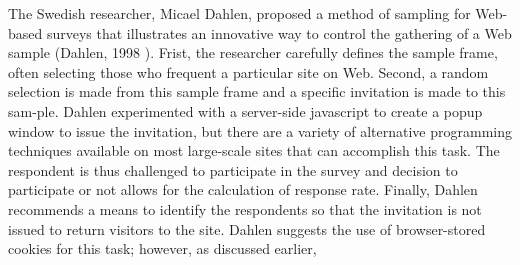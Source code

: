 \documentclass{article}
\begin{document}
The Swedish researcher, Micael Dahlen, proposed a method of sampling for Web-based surveys that illustrates an innovative way to control the gathering of a Web sample (Dahlen, 1998 ). Frist, the researcher carefully defines the sample frame, often selecting those who frequent a particular site on Web. Second, a random selection is made from this sample frame and a specific invitation is made to this sam-ple. Dahlen experimented with a server-side javascript to create a popup window to issue the invitation, but there are a variety of alternative programming techniques available on most large-scale sites that can accomplish this task. The respondent is thus challenged to participate in the survey and decision to participate or not allows for the calculation of response rate. Finally, Dahlen recommends a means to identify the respondents so that the invitation is not issued to return visitors to the site. Dahlen suggests the use of browser-stored cookies for this task; however, as discussed earlier,\\
\end{document}
